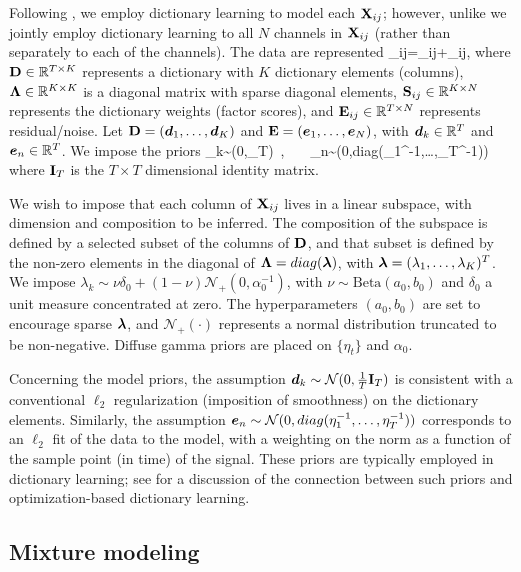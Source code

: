 \documentclass[journal]{IEEEtran}
\begin{document}
Following \cite{Bo2011}, we employ dictionary learning to model each ${\mathbf X}_{ij}$; however, unlike \cite{Bo2011} we jointly employ dictionary learning to all $N$ channels in ${\mathbf X}_{ij}$ (rather than separately to each of the channels). The data are represented
\beq\Xmat_{ij}=\Dmat \Lambdamat \Smat_{ij}+\Emat_{ij},\label{eq:basic}\eeq
where ${\mathbf D}\in\mathbb{R}^{T\times K}$ represents a dictionary with $K$ dictionary elements (columns), $\boldsymbol{\Lambda}\in\mathbb{R}^{K\times K}$ is a diagonal matrix with sparse diagonal elements, ${\mathbf S}_{ij}\in\mathbb{R}^{K\times N}$ represents the dictionary weights (factor scores), and ${\mathbf E}_{ij}\in\mathbb{R}^{T\times N}$ represents residual/noise. Let ${\mathbf D}=(\boldsymbol{d}_1,\dots,\boldsymbol{d}_K)$ and ${\mathbf E}=(\boldsymbol{e}_1,\dots,\boldsymbol{e}_N)$, with $\boldsymbol{d}_k\in\mathbb{R}^T$ and $\boldsymbol{e}_n\in\mathbb{R}^T$. We impose the priors
\beq \dv_k\sim{}(0,\Imat_T)~,~~~ \ev_n\sim{}(0,\mbox{diag}(\eta_1^{-1},\dots,\eta_T^{-1}))\eeq
where ${\mathbf I}_T$ is the $T\times T$ dimensional identity matrix.

We wish to impose that each column of ${\mathbf X}_{ij}$ lives in a linear subspace, with dimension and composition to be inferred. The composition of the subspace is defined by a selected subset of the columns of ${\mathbf D}$, and that subset is defined by the non-zero elements in the diagonal of $\boldsymbol{\Lambda}=\relax{diag}(\boldsymbol{\lambda})$, with $\boldsymbol{\lambda}=(\lambda_1,\dots,\lambda_K)^T$. We impose $\lambda_k\sim\nu\delta_0+(1-\nu)\mathcal{N}_+(0,\alpha_0^{-1})$, with $\nu\sim\mbox{Beta}(a_0,b_0)$ and $\delta_0$ a unit measure concentrated at zero. The hyperparameters $(a_0,b_0)$ are set to encourage sparse $\boldsymbol{\lambda}$, and $\mathcal{N}_+(\cdot)$ represents a normal distribution truncated to be non-negative. Diffuse gamma priors are placed on $\{\eta_t\}$ and $\alpha_0$.

Concerning the model priors, the assumption $\boldsymbol{d}_k\sim\mathcal{N}(0,\frac{1}{T}{\mathbf I}_T)$ is consistent with a conventional $\ell_2$ regularization (imposition of smoothness) on the dictionary elements. Similarly, the assumption $\boldsymbol{e}_n\sim\mathcal{N}(0,\relax{diag}(\eta_1^{-1},\dots,\eta_T^{-1}))$ corresponds to an $\ell_2$ fit of the data to the model, with a weighting on the norm as a function of the sample point (in time) of the signal. These priors are typically employed in dictionary learning; see \cite{Zhou12} for a discussion of the connection between such priors and optimization-based dictionary learning.

\subsection{Mixture modeling}
\end{document}

